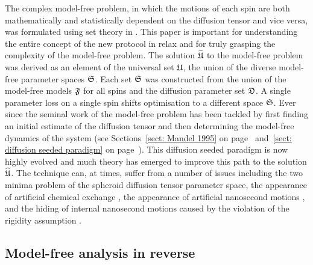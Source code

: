 \begin{htmlonly}
\begin{htmlonly}
The complex model-free problem, in which the motions of each spin are both mathematically and statistically dependent on the diffusion tensor and vice versa, was formulated using set theory in \citet{dAuvergneGooley07}.
This paper is important for understanding the entire concept of the new protocol in relax and for truly grasping the complexity of the model-free problem.
The solution $\widehat{\mathfrak{U}}$ to the model-free problem was derived as an element of the universal set $\mathfrak{U}$, the union of the diverse model-free parameter spaces $\mathfrak{S}$.
Each set $\mathfrak{S}$ was constructed from the union of the model-free models $\mathfrak{F}$ for all spins and the diffusion parameter set $\mathfrak{D}$.
A single parameter loss on a single spin shifts optimisation to a different space $\mathfrak{S}$.
Ever since the seminal work of \citet{Kay89} the model-free problem has been tackled by first finding an initial estimate of the diffusion tensor and then determining the model-free dynamics of the system (see Sections~\ref{sect: Mandel 1995} on page~\pageref{sect: Mandel 1995} and~\ref{sect: diffusion seeded paradigm} on page~\pageref{sect: diffusion seeded paradigm}).
This diffusion seeded paradigm is now highly evolved and much theory has emerged to improve this path to the solution $\widehat{\mathfrak{U}}$.
The technique can, at times, suffer from a number of issues including the two minima problem of the spheroid diffusion tensor parameter space, the appearance of artificial chemical exchange \citep{Tjandra96}, the appearance of artificial nanosecond motions \citep{Schurr94}, and the hiding of internal nanosecond motions caused by the violation of the rigidity assumption \citep{Orekhov95b, Orekhov99b, Orekhov99a}.




\subsection{Model-free analysis in reverse}


\end{htmlonly}
\end{htmlonly}
